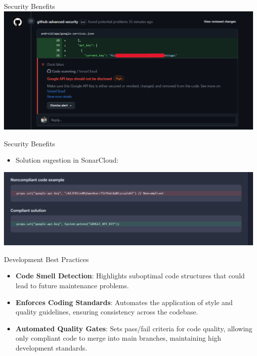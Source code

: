 \documentclass{beamer}
\begin{document}
\begin{frame}{Security Benefits}
  \includegraphics[width=1\textwidth]{fig/api-security-1.PNG}
\end{frame}

\begin{frame}{Security Benefits}
  \begin{itemize}
    \item Solution sugestion in SonarCloud: 
  \end{itemize}
  \vspace*{2em}
  \includegraphics[width=1.04\textwidth]{fig/api-security-2.PNG}
\end{frame}

\begin{frame}{Development Best Practices}
  \begin{itemize}
    \item \textbf{Code Smell Detection}: Highlights suboptimal code structures that could lead to future maintenance problems.
    \vspace*{0.75em}
    \item \textbf{Enforces Coding Standards}: Automates the application of style and quality guidelines, ensuring consistency across the codebase.
    \vspace*{0.75em}
    \item \textbf{Automated Quality Gates}: Sets pass/fail criteria for code quality, allowing only compliant code to merge into main branches, maintaining high development standards.
  \end{itemize}
\end{frame}
\end{document}
